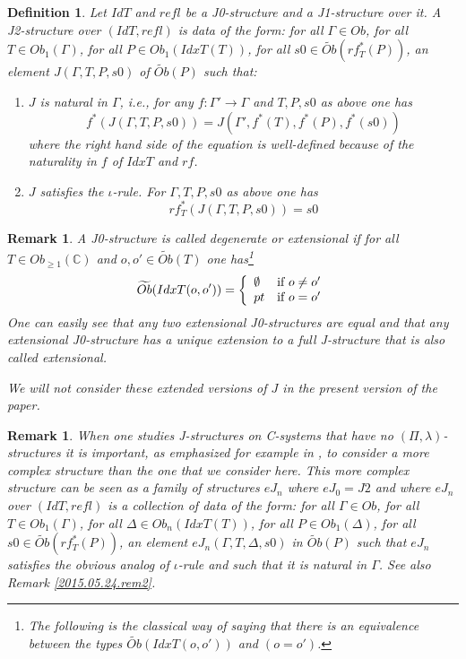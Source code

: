 \documentclass[12pt]{article}
\numberwithin{equation}{section}
\newtheorem{definition}[proposition]{Definition}
\newtheorem{remark}[proposition]{Remark}
\newcommand{\llabel}[1]{\label{#1}}
\newcommand{\sr}{\rightarrow}
\newcommand{\wt}{\widetilde}
\newcommand{\aCC}{{\mathbb C}}  %
\begin{document}
%
\begin{definition}
\llabel{2015.03.27.def3} Let $IdT$ and $refl$ be a J0-structure and a
J1-structure over it. A J2-structure over $(IdT,refl)$ is data of the form: for
all $\Gamma\in Ob$, for all $T\in Ob_1(\Gamma)$, for all $P\in Ob_1(IdxT(T))$,
for all $s0\in \wt{Ob}(rf_T^*(P))$, an element $J(\Gamma,T,P,s0)$ of
$\wt{Ob}(P)$ such that:
%
\begin{enumerate}
\item $J$ is natural in $\Gamma$, i.e., for any $f:\Gamma'\sr \Gamma$ and
  $T,P,s0$ as above one has
%
$$f^*(J(\Gamma,T,P,s0))=J(\Gamma',f^*(T),f^*(P),f^*(s0))$$
%
where the right hand side of the equation is well-defined because of the
naturality in $f$ of $IdxT$ and $rf$.
\item $J$ satisfies the $\iota$-rule. For $\Gamma, T, P, s0$ as above one has
%
$$rf_T^*(J(\Gamma,T,P,s0))=s0$$
%
\end{enumerate}
\end{definition}
%
\begin{remark}
\llabel{2015.05.12.rem1}\rm A J0-structure is called degenerate or extensional
if for all $T\in Ob_{\ge 1}(\aCC)$ and $o,o'\in \wt{Ob}(T)$ one has\footnote{The
  following is the classical way of saying that there is an equivalence between
  the types $\wt{Ob}(IdxT(o,o'))$ and $(o=o')$.}
%
$$\wt{Ob}(IdxT(o,o'))=\left\{
\begin{array}{ll}
\emptyset&\mbox{\rm if $o\ne o'$}\\ pt&\mbox{\rm if $o=o'$}
\end{array}
\right.
$$
%
One can easily see that any two extensional J0-structures are equal and that
any extensional J0-structure has a unique extension to a full J-structure that
is also called extensional.

We will not consider these extended versions of $J$ in the present version of
the paper.
\end{remark}


%
\begin{remark}\rm
\llabel{2015.05.24.rem1} When one studies J-structures on C-systems that have
no $(\Pi,\lambda)$-structures it is important, as emphasized for example in
\cite{vandenBergGarner2011}, to consider a more complex structure than the one
that we consider here. This more complex structure can be seen as a family of
structures $eJ_n$ where $eJ_0=J2$ and where $eJ_n$ over $(IdT,refl)$ is a
collection of data of the form: for all $\Gamma\in Ob$, for all $T\in
Ob_1(\Gamma)$, for all $\Delta\in Ob_{n}(IdxT(T))$, for all $P\in
Ob_1(\Delta)$, for all $s0\in \wt{Ob}(rf_T^*(P))$, an element
$eJ_n(\Gamma,T,\Delta,s0)$ in $\wt{Ob}(P)$ such that $eJ_n$ satisfies the
obvious analog of $\iota$-rule and such that it is natural in $\Gamma$. See
also Remark \ref{2015.05.24.rem2}.
\end{remark}
\end{document}
